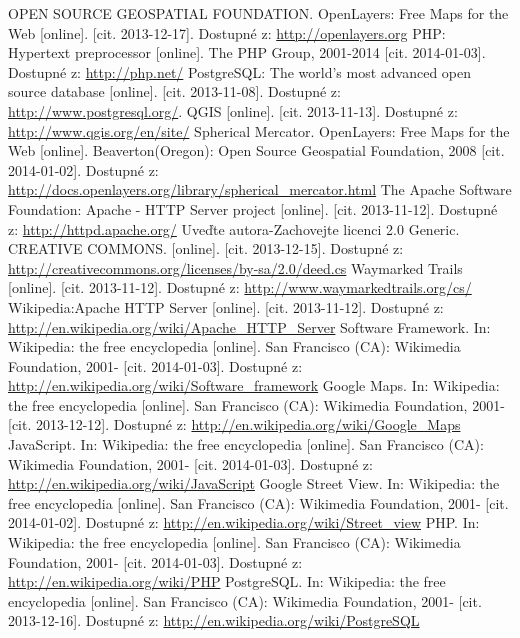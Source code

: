 \documentclass[11pt,a4paper,titlepage,oneside]{book}
\begin{document}
\begin{thebibliography}{99}
	OPEN SOURCE GEOSPATIAL FOUNDATION. OpenLayers: Free Maps for the Web [online]. [cit. 2013-12-17]. Dostupné z: \url{http://openlayers.org} 
	PHP: Hypertext preprocessor [online]. The PHP Group, 2001-2014 [cit. 2014-01-03]. Dostupné z: \url{http://php.net/}
	 PostgreSQL: The world's most advanced open source database [online]. [cit. 2013-11-08]. Dostupné z: \url{http://www.postgresql.org/}.
	QGIS [online]. [cit. 2013-11-13]. Dostupné z: \url{http://www.qgis.org/en/site/}
	Spherical Mercator. OpenLayers: Free Maps for the Web [online]. Beaverton(Oregon): Open Source Geospatial Foundation, 2008 [cit. 2014-01-02]. Dostupné z: \url{http://docs.openlayers.org/library/spherical_mercator.html}
	The Apache Software Foundation: Apache - HTTP Server project [online]. [cit. 2013-11-12]. Dostupné z: \url{http://httpd.apache.org/}
	Uveďte autora-Zachovejte licenci 2.0 Generic. CREATIVE COMMONS. [online]. [cit. 2013-12-15]. Dostupné z: \url{http://creativecommons.org/licenses/by-sa/2.0/deed.cs}
	 Waymarked Trails [online].  [cit. 2013-11-12]. Dostupné z: \url{http://www.waymarkedtrails.org/cs/}
	Wikipedia:Apache HTTP Server [online]. [cit. 2013-11-12]. Dostupné z: \url{http://en.wikipedia.org/wiki/Apache_HTTP_Server}	
       Software Framework. In: Wikipedia: the free encyclopedia [online]. San Francisco (CA): Wikimedia Foundation, 2001- [cit. 2014-01-03]. Dostupné z: \url{http://en.wikipedia.org/wiki/Software_framework}	
	Google Maps. In: Wikipedia: the free encyclopedia [online]. San Francisco (CA): Wikimedia Foundation, 2001- [cit. 2013-12-12]. Dostupné z: \url{http://en.wikipedia.org/wiki/Google_Maps}
       	JavaScript. In: Wikipedia: the free encyclopedia [online]. San Francisco (CA): Wikimedia Foundation, 2001- [cit. 2014-01-03]. Dostupné z: \url{http://en.wikipedia.org/wiki/JavaScript}
        Google Street View. In: Wikipedia: the free encyclopedia [online]. San Francisco (CA): Wikimedia Foundation, 2001- [cit. 2014-01-02]. Dostupné z: \url{http://en.wikipedia.org/wiki/Street_view}
	PHP. In: Wikipedia: the free encyclopedia [online]. San Francisco (CA): Wikimedia Foundation, 2001- [cit. 2014-01-03]. Dostupné z: \url{http://en.wikipedia.org/wiki/PHP}
	PostgreSQL. In: Wikipedia: the free encyclopedia [online]. San Francisco (CA): Wikimedia Foundation, 2001- [cit. 2013-12-16]. Dostupné z: \url{http://en.wikipedia.org/wiki/PostgreSQL}

\end{thebibliography}
\end{document}

